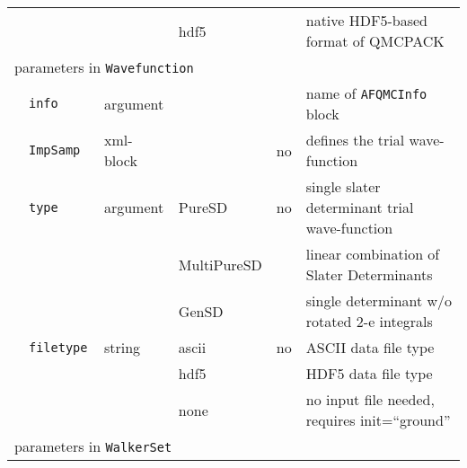 \begin{table}[h]
\begin{center}
\begin{tabularx}{\textwidth}{l l l l l l }
   &   \texttt{                } &             & hdf5          &      & native HDF5-based format of QMCPACK  \\
\multicolumn{6}{l}{parameters in \texttt{Wavefunction}}\\
   &   \texttt{info            } &  argument   &             &      & name of \texttt{AFQMCInfo} block \\
   &   \texttt{ImpSamp         } &  xml-block  &             & no   & defines the trial wave-function \\
   &   \texttt{type            } &  argument   & PureSD      & no   & single slater determinant trial wave-function \\
   &   \texttt{                } &             & MultiPureSD &      & linear combination of Slater Determinants \\
   &   \texttt{                } &             & GenSD       &      & single determinant w/o rotated 2-e integrals \\
   &   \texttt{filetype        } &  string     & ascii       & no   & ASCII data file type \\
   &   \texttt{                } &             & hdf5        &      & HDF5 data file type \\
   &   \texttt{                } &             & none        &      & no input file needed, requires init=``ground'' \\
\multicolumn{6}{l}{parameters in \texttt{WalkerSet}} \\

\end{tabularx}
\end{center}
\end{table}

